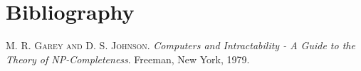 \chapter{Bibliography}
\begin{thebibliography}{}
    \textsc{M. R. Garey and D. S. Johnson}.
    \emph{Computers and Intractability - A Guide to the Theory of NP-Completeness}.
    Freeman, New York, 1979.
\end{thebibliography}